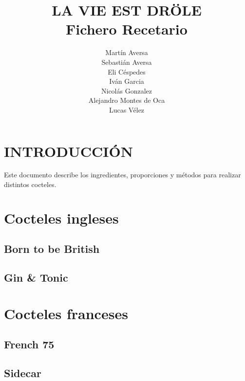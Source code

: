\documentclass[a4paper]{spie}  %
\title{\uppercase{ {\fontsize{120}{120}\selectfont La vie est dr\"{o}le}} \\ 
\bigskip \bigskip \bigskip \bigskip
{\fontsize{40}{40}\selectfont Fichero Recetario}}
\author{Mart\'in Aversa \\
Sebasti\'an Aversa \\
Eli C\'espedes \\
Iv\'an Garcia \\
Nicol\'as Gonzalez \\
Alejandro Montes de Oca \\
Lucas V\'elez
\skiplinehalf}
\begin{document}
 
  \maketitle 

\section{INTRODUCCI\'ON}
\label{sec:intro}  %

Este documento describe los ingredientes, proporciones y m\'etodos para realizar distintos cocteles.
\bigskip
\bigskip
\tableofcontents

\newpage
\section{Cocteles ingleses}
\bigskip \bigskip \bigskip
\subsection{Born to be British}

\newpage

\newpage
\bigskip \bigskip \bigskip
\subsection{Gin \& Tonic}

\newpage

\newpage
\section{Cocteles franceses}
\bigskip \bigskip \bigskip
\subsection{French 75}

\newpage

\newpage
\bigskip \bigskip \bigskip
\subsection{Sidecar}

\newpage
\end{document}
